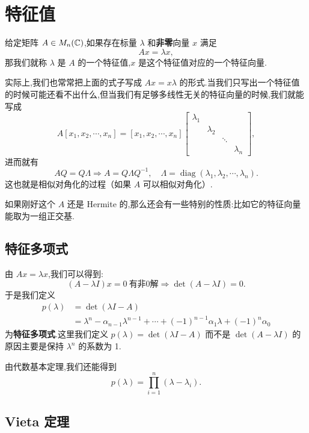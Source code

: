 \section{特征值}

\begin{definition}
给定矩阵 $A \in M_n(\mathbb{C})$,如果存在标量 $\lambda$ 和\textbf{非零}向量 $x$ 满足
\[
    Ax = \lambda x,
\]
那我们就称 $\lambda$ 是 $A$ 的一个特征值,$x$ 是这个特征值对应的一个特征向量.
\end{definition}

实际上,我们也常常把上面的式子写成 $Ax = x\lambda$ 的形式.当我们只写出一个特征值的时候可能还看不出什么,但当我们有足够多线性无关的特征向量的时候,我们就能写成
\[
    A[x_1,x_2,\cdots,x_n] = [x_1,x_2,\cdots,x_n]
    \begin{bmatrix}
        \lambda_1 & & & \\
        & \lambda_2 & & \\
        & & \ddots & \\
        & & & \lambda_n
    \end{bmatrix},
\]
进而就有
\[
    AQ = Q\Lambda \Rightarrow A = Q\Lambda Q^{-1}, \quad \Lambda = \operatorname{diag}(\lambda_1,\lambda_2,\cdots,\lambda_n).
\]
这也就是相似对角化的过程（如果 $A$ 可以相似对角化）.

如果刚好这个 $A$ 还是 Hermite 的,那么还会有一些特别的性质:比如它的特征向量能取为一组正交基.

\subsection{特征多项式}

由 $Ax = \lambda x$,我们可以得到:
\[
    (A - \lambda I)x = 0 \ \text{有非0解} \Rightarrow \det(A - \lambda I) = 0.
\]
于是我们定义
\[
    \begin{aligned}
        p(\lambda) &= \det(\lambda I - A) \\
        &= \lambda^n - \alpha_{n-1}\lambda^{n-1} + \cdots + (-1)^{n-1}\alpha_1\lambda + (-1)^n\alpha_0
    \end{aligned}
\]
为\textbf{特征多项式}.这里我们定义 $p(\lambda) = \det(\lambda I - A)$ 而不是 $\det(A - \lambda I)$ 的原因主要是保持 $\lambda^n$ 的系数为 1.

由代数基本定理,我们还能得到
\[
    p(\lambda) = \prod_{i=1}^n (\lambda - \lambda_i).
\]

\subsection{Vieta 定理}

